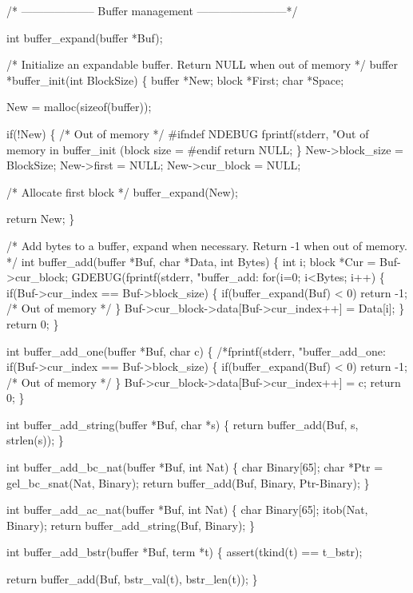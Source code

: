 /* -------------------- Buffer management ------------------------*/

int buffer_expand(buffer *Buf);

/* Initialize an expandable buffer.
   Return NULL when out of memory */
buffer *buffer_init(int BlockSize)
\{
  buffer *New;
  block *First;
  char *Space;

  New   = malloc(sizeof(buffer));

  if(!New)
     \{
       /* Out of memory */
       #ifndef NDEBUG
       fprintf(stderr, "Out of memory in buffer_init (block size = %
       #endif
       return NULL;
     \}
  New->block_size = BlockSize;
  New->first      = NULL;
  New->cur_block  = NULL;

  /* Allocate first block */
  buffer_expand(New);

  return New;
\}

/* Add bytes to a buffer, expand when necessary.
   Return -1 when out of memory. */
int buffer_add(buffer *Buf, char *Data, int Bytes)
\{
  int i;
  block *Cur = Buf->cur_block;
  GDEBUG(fprintf(stderr, "buffer_add: %
  for(i=0; i<Bytes; i++)
    \{
      if(Buf->cur_index == Buf->block_size)
        \{
          if(buffer_expand(Buf) < 0)
            return -1; /* Out of memory */
        \}
      Buf->cur_block->data[Buf->cur_index++] = Data[i];
    \}
  return 0;
\}

int buffer_add_one(buffer *Buf, char c)
\{
  /*fprintf(stderr, "buffer_add_one: %
  if(Buf->cur_index == Buf->block_size)
    \{
      if(buffer_expand(Buf) < 0)
        return -1; /* Out of memory */
    \}
  Buf->cur_block->data[Buf->cur_index++] = c;
  return 0;
\}

int buffer_add_string(buffer *Buf, char *s)
\{
  return buffer_add(Buf, s, strlen(s));
\}

int buffer_add_bc_nat(buffer *Buf, int Nat)
\{
  char Binary[65];
  char *Ptr = gel_bc_snat(Nat, Binary);
  return buffer_add(Buf, Binary, Ptr-Binary);
\}

int buffer_add_ac_nat(buffer *Buf, int Nat)
\{
  char Binary[65];
  itob(Nat, Binary);
  return buffer_add_string(Buf, Binary);
\}

int buffer_add_bstr(buffer *Buf, term *t)
\{
  assert(tkind(t) == t_bstr);

  return buffer_add(Buf, bstr_val(t), bstr_len(t));
\} 

